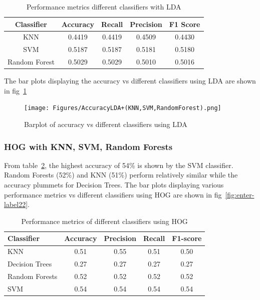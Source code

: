 \documentclass[a4paper]{article}
\theoremstyle{plain}
\theoremstyle{definition}
\begin{document}
{\begin{table}[h]
    \centering
    \begin{tabular}{|c|c|c|c|c|}
    \hline
    \textbf{Classifier} & \textbf{Accuracy} & \textbf{Recall} & \textbf{Precision} & \textbf{F1 Score} \\
    \hline
    KNN & 0.4419 & 0.4419 & 0.4509 & 0.4430 \\
    SVM & 0.5187 & 0.5187 & 0.5181 & 0.5180 \\
    Random Forest & 0.5029 & 0.5029 & 0.5010 & 0.5016 \\
    \hline
    \end{tabular}
    \caption{Performance metrics different classifiers with LDA}
    \label{tab:classifier}
\end{table}
\noindent The bar plots displaying the accuracy vs different classifiers using LDA are shown in fig~\ref{fig:enter-label0}
\begin{figure}[H]
    \centering
    \texttt{[image: Figures/AccuracyLDA+(KNN,SVM,RandomForest).png]}
    \caption{Barplot of accuracy vs different classifiers using LDA}
    \label{fig:enter-label0}
\end{figure}

\subsubsection {HOG with KNN, SVM, Random Forests}
\noindent From table~\ref{tab:hi}, the highest accuracy of 54\% is shown by the SVM classifier. Random Forests (52\%) and KNN (51\%) perform relatively similar while the accuracy plummets for Decision Trees.
The bar plots displaying various performance metrics vs different classifiers using HOG are shown in fig~\ref{fig:enter-label22}.


\begin{table}[H]
    \centering
    
    \begin{tabular}{lcccc}
        \hline
        Classifier & Accuracy & Precision & Recall & F1-score \\
        \hline
        KNN & 0.51 & 0.55 & 0.51 & 0.50 \\
        Decision Trees & 0.27 & 0.27 & 0.27 & 0.27 \\
        Random Forests & 0.52 & 0.52 & 0.52 & 0.52 \\
        SVM & 0.54 & 0.54 & 0.54 & 0.54 \\
        \hline
     \end{tabular}
     \caption{Performance metrics of different classifiers using HOG}
    \label{tab:hi}
\end{table}

}
\end{document}
